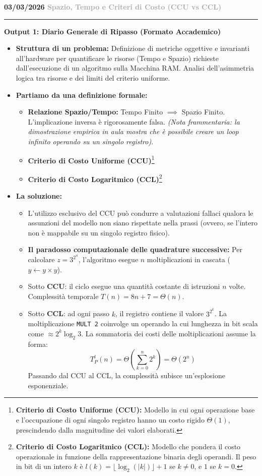 \documentclass[a4paper, 11pt]{report}
\newcommand{\lezione}[2]{
\vspace{2em}
\noindent\textbf{\Large #1 \hfill \textcolor{darkgray}{#2}}
\vspace{0.5em}
\hrule
\vspace{1.5em}
}
\newcommand{\definizione}[2]{%
\textbf{#1}\footnote{\textbf{#1:} #2}%
}
\begin{document}
\lezione{03/03/2026}{Spazio, Tempo e Criteri di Costo (CCU vs CCL)}
\vspace{0.5cm}
\textbf{Output 1: Diario Generale di Ripasso (Formato Accademico)}
\begin{itemize}
\item \textbf{Struttura di un problema:}
Definizione di metriche oggettive e invarianti all'hardware per quantificare le risorse (Tempo e Spazio) richieste dall'esecuzione di un algoritmo sulla Macchina RAM. Analisi dell'asimmetria logica tra risorse e dei limiti del criterio uniforme.

\item \textbf{Partiamo da una definizione formale:}
\begin{itemize}
    \item \textbf{Relazione Spazio/Tempo:} Tempo Finito $\implies$ Spazio Finito. L'implicazione inversa è rigorosamente falsa. \textit{(Nota frammentaria: la dimostrazione empirica in aula mostra che è possibile creare un loop infinito operando su un singolo registro)}.
    \item \definizione{Criterio di Costo Uniforme (CCU)}{Modello in cui ogni operazione base e l'occupazione di ogni singolo registro hanno un costo rigido $\Theta(1)$, prescindendo dalla magnitudine dei valori elaborati.}
    \item \definizione{Criterio di Costo Logaritmico (CCL)}{Modello che pondera il costo operazionale in funzione della rappresentazione binaria degli operandi. Il peso in bit di un intero $k$ è $l(k) = \lfloor \log_2(|k|) \rfloor + 1$ se $k \neq 0$, e $1$ se $k=0$.}
\end{itemize}

\item \textbf{La soluzione:}
\begin{itemize}
    \item L'utilizzo esclusivo del CCU può condurre a valutazioni fallaci qualora le assunzioni del modello non siano rispettate nella prassi (ovvero, se l'intero non è mappabile su un singolo registro fisico).
    \item \textbf{Il paradosso computazionale delle quadrature successive:} Per calcolare $z = 3^{2^n}$, l'algoritmo esegue $n$ moltiplicazioni in cascata ($y \leftarrow y \times y$).
    \item Sotto \textbf{CCU}: il ciclo esegue una quantità costante di istruzioni $n$ volte. Complessità temporale $T(n) = 8n + 7 = \Theta(n)$.
    \item Sotto \textbf{CCL}: ad ogni passo $k$, il registro contiene il valore $3^{2^k}$. La moltiplicazione \texttt{MULT 2} coinvolge un operando la cui lunghezza in bit scala come $\approx 2^k \log_2 3$.
    La sommatoria dei costi delle moltiplicazioni assume la forma:
    \[ T^l_P(n) = \Theta \left( \sum_{k=0}^{n} 2^k \right) = \Theta(2^n) \]
    Passando dal CCU al CCL, la complessità subisce un'esplosione esponenziale.
\end{itemize}
\end{itemize}
\end{document}
